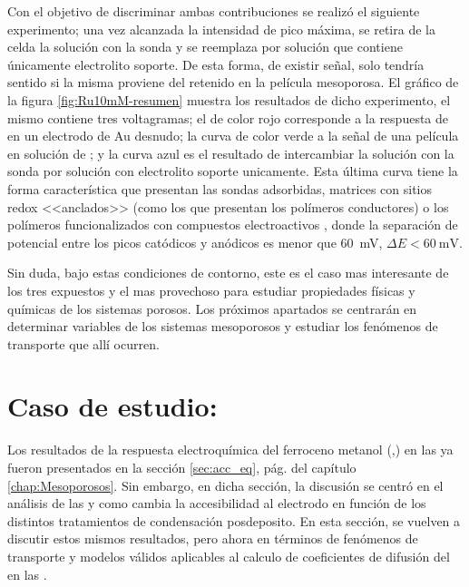 		Con el objetivo de discriminar ambas contribuciones se realizó el siguiente experimento; una vez alcanzada la intensidad de pico máxima, se retira de la celda la solución con la sonda y se reemplaza por solución que contiene únicamente electrolito soporte. De esta forma, de existir señal, solo tendría sentido si la misma proviene del \ru\space retenido en la película mesoporosa. El gráfico de la figura \ref{fig:Ru10mM-resumen} muestra los resultados de dicho experimento, el mismo contiene tres voltagramas; el de color rojo corresponde a la respuesta de \ru\space en un electrodo de Au desnudo; la curva de color verde a la señal de una película en solución de \ru; y la curva azul es el resultado de intercambiar la solución con la sonda por solución con electrolito soporte unicamente. Esta última curva tiene la forma característica que presentan las sondas adsorbidas, matrices con sitios redox <<anclados>>\cite{Ybarra2005} (como los que presentan los polímeros conductores) o los polímeros funcionalizados con compuestos electroactivos \cite{Rohlfing2005,Vila2015}, donde la separación de potencial entre los picos catódicos y anódicos es menor que \SI{60}{\milli\volt}, $\Delta E < \SI{60}{\milli\volt}$\cite{Wi2000}.

		Sin duda, bajo estas condiciones de contorno, este es el caso mas interesante de los tres expuestos y el mas provechoso para estudiar propiedades físicas y químicas de los sistemas porosos. Los próximos apartados se centrarán en determinar variables de los sistemas mesoporosos y estudiar los fenómenos de transporte que allí ocurren.

\section{Caso de estudio: \texorpdfstring{\ferroceno}{FeOH}}\label{sec:difusion}

	 Los resultados de la respuesta electroquímica del ferroceno metanol \linebreak (\ferroceno,\fc) en las \pdmF\space ya fueron presentados en la sección \ref{sec:acc_eq}, pág. \pageref{sec:acc_eq} del capítulo \ref{chap:Mesoporosos}. Sin embargo, en dicha sección, la discusión se centró en el análisis de las \pdm\space y como cambia la accesibilidad al electrodo en función de los distintos tratamientos de condensación posdeposito.
	 En esta sección, se vuelven a discutir estos mismos resultados, pero ahora en términos de fenómenos de transporte y modelos válidos aplicables al calculo de coeficientes de difusión del \fc\space en las \pdm.

